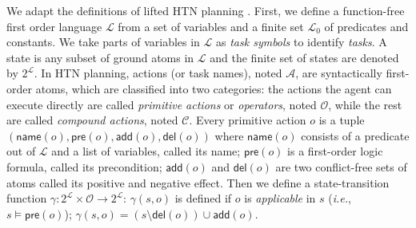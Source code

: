 \documentclass[letterpaper]{article} %
\newcommand{\Actions}{\mathcal{A}}
\newcommand{\Operators}{\mathcal{O}}
\newcommand{\Cactions}{\mathcal{C}}
\newcommand{\Lvar}{\mathcal{L}}
\newcommand{\pre}{\mathsf{pre}}
\newcommand{\add}{\mathsf{add}}
\newcommand{\del}{\mathsf{del}}
\newcommand{\name}{\mathsf{name}}
\begin{document}
We adapt the definitions of lifted HTN planning \cite{alford2015tighttihtn}.
First, we define a function-free first order language $\Lvar$ from a set of variables and a finite set $\Lvar_0$ of predicates and constants.
We take parts of variables in $\Lvar$ as \emph{task symbols} to identify \emph{tasks}.
A state is any subset of ground atoms in $\Lvar$ and the finite set of states are denoted by $2^\Lvar$.
In HTN planning, actions (or task names), noted $\Actions$, are syntactically first-order atoms,
which are classified into two categories: the actions the agent can execute directly are called \emph{primitive actions} or \emph{operators}, noted $\Operators$, while the rest are called \emph{compound actions}, noted $\Cactions$.
Every primitive action $o$ is a tuple $(\name(o),\pre(o),\add(o),\del(o))$ where %
$\name(o)$ consists of a predicate out of $\Lvar$ and a list of variables, called its name;
$\pre(o)$ is a first-order logic formula, called its precondition; $\add(o)$ and $\del(o)$ are two conflict-free sets of atoms called its positive and negative effect.
Then we define a state-transition function $\gamma: 2^{\Lvar} \times \Operators \longrightarrow 2^{\Lvar}$:
$\gamma(s,o)$ is defined if $o$ is \emph{applicable} in $s$ (\emph{i.e.}, $s \models \pre(o)$);
$\gamma(s,o){=}(s {\setminus} \del(o)) {\cup} \add(o)$.
\end{document}
